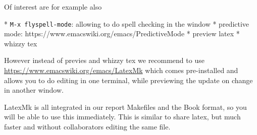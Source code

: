 
Of interest are for example also 

* \verb|M-x flyspell-mode|: allowing to do spell checking in the window
* predictive mode: https://www.emacswiki.org/emacs/PredictiveMode
* preview latex
* whizzy tex

However instead of previes and whizzy tex we recommend to use
\url{https://www.emacswiki.org/emacs/LatexMk} which comes pre-installed
and allows you to do editing in one terminal, while previewing the
update on change in another window.

LatexMk is all integrated in our report Makefiles and the Book format,
so you will be able to use this immediately. This is similar to share
latex, but much faster and without collaborators editing the same file.